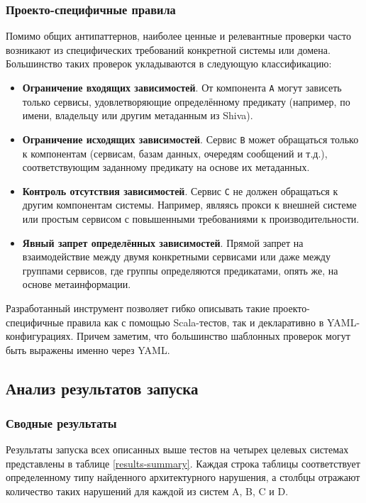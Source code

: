 \subsubsection{Проекто-специфичные правила}

Помимо общих антипаттернов, наиболее ценные и релевантные проверки часто возникают из специфических требований конкретной системы или домена. Большинство таких проверок укладываются в следующую классификацию:

\begin{itemize}
    \item \textbf{Ограничение входящих зависимостей}. От компонента \verb|А| могут зависеть только сервисы, удовлетворяющие определённому предикату (например, по имени, владельцу или другим метаданным из Shiva).
    \item \textbf{Ограничение исходящих зависимостей}. Сервис \verb|B| может обращаться только к компонентам (сервисам, базам данных, очередям сообщений и т.д.), соответствующим заданному предикату на основе их метаданных.
    \item \textbf{Контроль отсутствия зависимостей}. Сервис \verb|C| не должен обращаться к другим компонентам системы. Например, являясь прокси к внешней системе или простым сервисом с повышенными требованиями к производительности.
    \item \textbf{Явный запрет определённых зависимостей}. Прямой запрет на взаимодействие между двумя конкретными сервисами или даже между группами сервисов, где группы определяются предикатами, опять же, на основе метаинформации.
\end{itemize}

Разработанный инструмент позволяет гибко описывать такие проекто-специфичные правила как с помощью Scala-тестов, так и декларативно в YAML-конфигурациях. Причем заметим, что большинство шаблонных проверок могут быть выражены именно через YAML.

\subsection{Анализ результатов запуска}

\subsubsection{Сводные результаты}

Результаты запуска всех описанных выше тестов на четырех целевых системах представлены в таблице \ref{results-summary}. Каждая строка таблицы соответствует определенному типу найденного архитектурного нарушения, а столбцы отражают количество таких нарушений для каждой из систем A, B, C и D.

